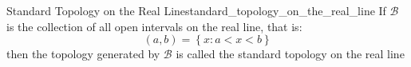 \begin{definition}
{Standard Topology on the Real Line}{standard_topology_on_the_real_line}
    If \(\mathcal{B} \) is the collection of all open intervals on the real
    line, that is:
    \[
    \left(a, b\right) = \left\{x : a < x < b \right\}
    \]
    then the topology generated by \(\mathcal{B} \) is called the standard
    topology on the real line
\end{definition}
